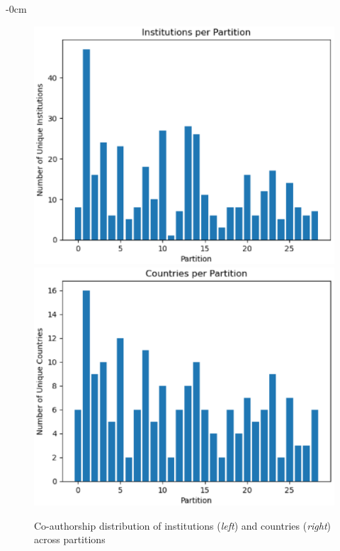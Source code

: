 \documentclass[jmse,review,submit,pdftex,moreauthors]{Definitions/mdpi}
\begin{document}
\begin{adjustwidth}{-\extralength}{0cm}
\begin{figure}[H]
	\centering
	\includegraphics[height=0.2\textheight, keepaspectratio]{pics/coauthorship_inst_per_partition.eps}
	\includegraphics[height=0.2\textheight, keepaspectratio]{pics/coauthorship_country_per_partition.eps}
	\caption{Co-authorship distribution of institutions (\textit{left}) and countries (\textit{right}) across partitions}\label{fig:fig5}
\end{figure}


\end{adjustwidth}
\end{document}
